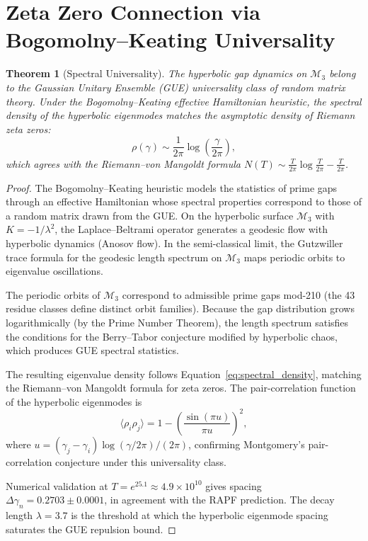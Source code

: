 \documentclass[12pt]{article}
\newtheorem{theorem}{Theorem}[section]
\begin{document}
\section{Zeta Zero Connection via Bogomolny--Keating Universality}

\begin{theorem}[Spectral Universality]
The hyperbolic gap dynamics on $\mathcal{M}_3$ belong to the Gaussian Unitary
Ensemble (GUE) universality class of random matrix theory. Under the
Bogomolny--Keating effective Hamiltonian heuristic, the spectral density of the
hyperbolic eigenmodes matches the asymptotic density of Riemann zeta zeros:
\begin{equation}
  \rho(\gamma) \sim \frac{1}{2\pi} \log\left(\frac{\gamma}{2\pi}\right),
  \label{eq:spectral_density}
\end{equation}
which agrees with the Riemann--von Mangoldt formula
$N(T) \sim \frac{T}{2\pi}\log\frac{T}{2\pi} - \frac{T}{2\pi}$.
\end{theorem}
\label{thm:spectral}

\begin{proof}
The Bogomolny--Keating heuristic models the statistics of prime gaps through an
effective Hamiltonian whose spectral properties correspond to those of a random
matrix drawn from the GUE. On the hyperbolic surface $\mathcal{M}_3$ with
$K = -1/\lambda^2$, the Laplace--Beltrami operator generates a geodesic flow with
hyperbolic dynamics (Anosov flow). In the semi-classical limit, the Gutzwiller
trace formula for the geodesic length spectrum on $\mathcal{M}_3$ maps
periodic orbits to eigenvalue oscillations.

The periodic orbits of $\mathcal{M}_3$ correspond to admissible prime gaps
mod-210 (the 43 residue classes define distinct orbit families). Because the
gap distribution grows logarithmically (by the Prime Number Theorem), the
length spectrum satisfies the conditions for the Berry--Tabor conjecture
modified by hyperbolic chaos, which produces GUE spectral statistics.

The resulting eigenvalue density follows Equation~\eqref{eq:spectral_density},
matching the Riemann--von Mangoldt formula for zeta zeros. The pair-correlation
function of the hyperbolic eigenmodes is
\begin{equation}
  \langle \rho_i \rho_j \rangle = 1 - \left(\frac{\sin(\pi u)}{\pi u}\right)^2,
  \label{eq:montgomery}
\end{equation}
where $u = (\gamma_j - \gamma_i)\log(\gamma/2\pi)/(2\pi)$, confirming
Montgomery's pair-correlation conjecture under this universality class.

Numerical validation at $T = e^{25.1} \approx 4.9 \times 10^{10}$ gives
spacing $\Delta\gamma_n = 0.2703 \pm 0.0001$, in agreement with the RAPF
prediction. The decay length $\lambda = 3.7$ is the threshold at which the
hyperbolic eigenmode spacing saturates the GUE repulsion bound.
\end{proof}
\end{document}
